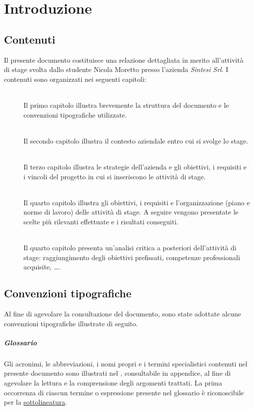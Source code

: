 \chapter{Introduzione}
\label{ch:tesi:intro}

\section{Contenuti}
Il presente documento costituisce una relazione dettagliata in merito all'attività di stage svolta dallo studente Nicola Moretto presso l'azienda \textit{Sintesi Srl}. I contenuti sono organizzati nei seguenti capitoli:
\begin{description}
  \item[] \hfill \\
  Il primo capitolo illustra brevemente la struttura del documento e le convenzioni tipografiche utilizzate.
  \item[] \hfill \\
  Il secondo capitolo illustra il contesto aziendale entro cui si svolge lo stage.
  \item[] \hfill \\
  Il terzo capitolo illustra le strategie dell'azienda e gli obiettivi, i requisiti e i vincoli del progetto in cui si inseriscono le attività di stage.
  \item[] \hfill \\ 
	Il quarto capitolo illustra gli obiettivi, i requisiti e l'organizzazione (piano e norme di lavoro) delle attività di stage. A seguire vengono presentate le scelte più rilevanti effettuate e i risultati conseguiti.
  \item[] \hfill \\
	Il quarto capitolo presenta un'analisi critica a posteriori dell'attività di stage: raggiungimento degli obiettivi prefissati, competenze professionali acquisite, \ldots.
\end{description}

\section{Convenzioni tipografiche}
Al fine di agevolare la consultazione del documento, sono state adottate alcune convenzioni tipografiche illustrate di seguito.

\paragraph{Glossario} Gli acronimi, le abbreviazioni, i nomi propri e i termini specialistici contenuti nel presente documento sono illustrati nel \textit{}, consultabile in appendice, al fine di agevolare la lettura e la comprensione degli argomenti trattati.	La prima occorrenza di ciascun termine o espressione presente nel glossario è riconoscibile per la \underline{sottolineatura}.

